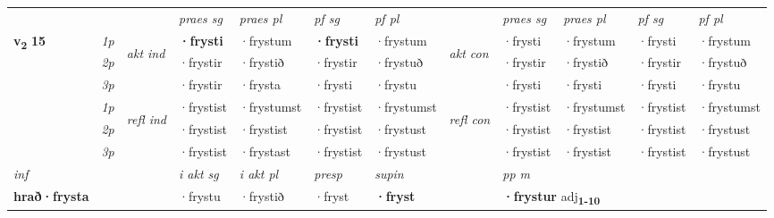 \begin{longtable}[l]{X>{\footnotesize\itshape}llXXXXlXXXX}
 & &   & \textit{praes sg}  & \textit{praes pl}    & \textit{ pf sg} & \textit{pf pl} & & \textit{praes sg}  & \textit{praes pl}    & \textit{pf sg} & \textit{pf pl }  \\ \cmidrule{4-7} \cmidrule{9-12}
 \multirow{2}{*}{{{\textbf{v{\textsubscript{2}}} \Large{\textbf{15}}}}}  & 1p & \multirow{3}{*}{\begin{turn}{90}\textit{akt ind}\end{turn}} & \textbf{·frysti} & ·frystum & \textbf{·frysti} & ·frystum & \multirow{3}{*}{\begin{turn}{90}\textit{akt con}\end{turn}} &·frysti & ·frystum & ·frysti & ·frystum\\*
 & 2p &  &  ·frystir  & ·frystið & ·frystir & ·frystuð & & ·frystir & ·frystið & ·frystir & ·frystuð \\*
 & 3p &  & ·frystir & ·frysta & ·frysti & ·frystu & & ·frysti & ·frysti& ·frysti & ·frystu \\*
\cmidrule{4-7} \cmidrule{9-12}
 & 1p & \multirow{3}{*}{\begin{turn}{90}\textit{refl ind}\end{turn}}  & ·frystist & ·frystumst & ·frystist & ·frystumst & \multirow{3}{*}{\begin{turn}{90}\textit{refl con}\end{turn}}  &·frystist & ·frystumst & ·frystist & ·frystumst \\*
 & 2p &  & ·frystist & ·frystist & ·frystist & ·frystust & &·frystist & ·frystist & ·frystist & ·frystust \\*
 & 3p  & & ·frystist & ·frystast & ·frystist & ·frystust & & ·frystist & ·frystist& ·frystist & ·frystust \\*
\cmidrule{4-7} \cmidrule{9-12}

   {\textit{inf}} & &  & \textit{i akt sg} & \textit{i akt pl}   & \textit{presp} & \textit{supin}  && \textit{pp m} \\*
  {\textbf{hrað\allowbreak ·frysta}} & && ·frystu  & ·frystið   & ·fryst &  \textbf{·fryst}  && \multicolumn{2}{l}{\textbf{·frystur} adj\textbf{\textsubscript{1-10}}} \\*

\midrule


\end{longtable}
